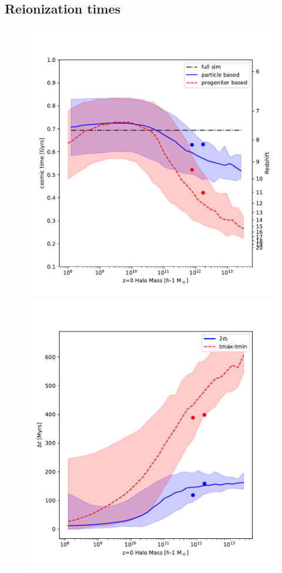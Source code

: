 \documentclass[twocolumn]{aastex61}
\begin{document}
\subsection{Reionization times}

\begin{figure}[ht]
\includegraphics[width=0.94\columnwidth]{img/track_treion_LG.pdf}
\includegraphics[width=0.94\columnwidth]{img/track_dt_2sig_LG.pdf}

\end{figure}
\end{document}
